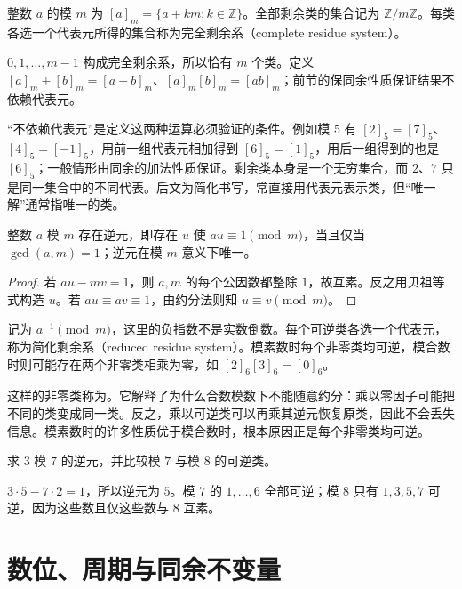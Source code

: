 \documentclass[UTF8,12pt,a4paper,fontset=fandol]{ctexbook}
\begin{document}
\begin{definition}
整数 $a$ 的模 $m$ 为 $[a]_m=\{a+km:k\in\mathbb Z\}$。全部剩余类的集合记为 $\mathbb Z/m\mathbb Z$。每类各选一个代表元所得的集合称为完全剩余系（complete residue system）。
\end{definition}

$0,1,\ldots,m-1$ 构成完全剩余系，所以恰有 $m$ 个类。定义 $[a]_m+[b]_m=[a+b]_m$、$[a]_m[b]_m=[ab]_m$；前节的保同余性质保证结果不依赖代表元。

“不依赖代表元”是定义这两种运算必须验证的条件。例如模 $5$ 有 $[2]_5=[7]_5$、$[4]_5=[-1]_5$，用前一组代表元相加得到 $[6]_5=[1]_5$，用后一组得到的也是 $[6]_5$；一般情形由同余的加法性质保证。剩余类本身是一个无穷集合，而 $2$、$7$ 只是同一集合中的不同代表。后文为简化书写，常直接用代表元表示类，但“唯一解”通常指唯一的类。

\begin{theorem}[模逆元]
\label{thm:modular-inverse}
整数 $a$ 模 $m$ 存在逆元，即存在 $u$ 使 $au\equiv1\pmod m$，当且仅当 $\gcd(a,m)=1$；逆元在模 $m$ 意义下唯一。
\end{theorem}
\begin{proof}
若 $au-mv=1$，则 $a,m$ 的每个公因数都整除 $1$，故互素。反之用贝祖等式构造 $u$。若 $au\equiv av\equiv1$，由约分法则知 $u\equiv v\pmod m$。
\end{proof}

记为 $a^{-1}\pmod m$，这里的负指数不是实数倒数。每个可逆类各选一个代表元，称为简化剩余系（reduced residue system）。模素数时每个非零类均可逆，模合数时则可能存在两个非零类相乘为零，如 $[2]_6[3]_6=[0]_6$。

这样的非零类称为。它解释了为什么合数模数下不能随意约分：乘以零因子可能把不同的类变成同一类。反之，乘以可逆类可以再乘其逆元恢复原类，因此不会丢失信息。模素数时的许多性质优于模合数时，根本原因正是每个非零类均可逆。

\begin{example}
求 $3$ 模 $7$ 的逆元，并比较模 $7$ 与模 $8$ 的可逆类。
\end{example}
\begin{solve}
$3\cdot5-7\cdot2=1$，所以逆元为 $5$。模 $7$ 的 $1,\ldots,6$ 全部可逆；模 $8$ 只有 $1,3,5,7$ 可逆，因为这些数且仅这些数与 $8$ 互素。
\end{solve}

\section{数位、周期与同余不变量}
\end{document}

